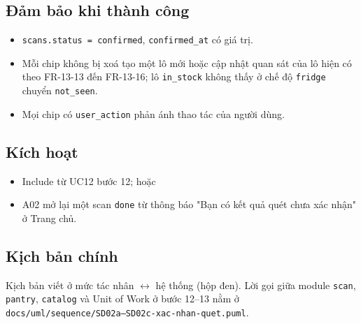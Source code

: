 \subsection{Đảm bảo khi thành công}
\begin{itemize}
\item {\small\texttt{scans.\allowbreak{}status = confirmed}}, {\small\texttt{confirmed\_\allowbreak{}\allowbreak{}at}} có giá trị.
\item Mỗi chip không bị xoá tạo một lô mới hoặc cập nhật quan sát của lô hiện có theo FR-\allowbreak{}13-\allowbreak{}13 đến FR-\allowbreak{}13-\allowbreak{}16; lô {\small\texttt{in\_\allowbreak{}\allowbreak{}stock}} không thấy ở chế độ {\small\texttt{fridge}} chuyển {\small\texttt{not\_\allowbreak{}\allowbreak{}seen}}.
\item Mọi chip có {\small\texttt{user\_\allowbreak{}\allowbreak{}action}} phản ánh thao tác của người dùng.
\end{itemize}
\subsection{Kích hoạt}
\begin{itemize}
\item Include từ UC12 bước 12; hoặc
\item A02 mở lại một scan {\small\texttt{done}} từ thông báo "Bạn có kết quả quét chưa xác nhận" ở Trang chủ.
\end{itemize}
\subsection{Kịch bản chính}
Kịch bản viết ở mức tác nhân \ensuremath{\leftrightarrow} hệ thống (hộp đen). Lời gọi giữa module {\small\texttt{scan}}, {\small\texttt{pantry}}, {\small\texttt{catalog}} và Unit of Work ở bước 12--13 nằm ở {\small\texttt{docs/\allowbreak{}\allowbreak{}uml/\allowbreak{}\allowbreak{}sequence/\allowbreak{}\allowbreak{}SD02a–SD02c-\allowbreak{}xac-\allowbreak{}nhan-\allowbreak{}quet.\allowbreak{}puml}}.

